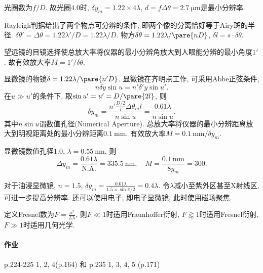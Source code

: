 \documentclass{ctexart}
\begin{document}
\begin{sample}
    \begin{ex}
        光圈数为$f/D$. 故光圈$4.0$时, $\delta y_m = 1.22\times 4\lambda$, $d = f\Delta\theta = \SI{2.7}{\micro\meter}$是最小分辨率.
    \end{ex}
\end{sample}
Rayleigh判据给出了两个物点可分辨的条件, 即两个像的分离恰好等于Airy斑的半径. $\delta\theta' = \Delta\theta = 1.22\lambda'/D = 1.22\lambda/D$. 物方$\displaystyle \delta\theta = 1.22\lambda/\pare{nD}$, $\delta l = s\cdot\delta\theta$.
\par
望远镜的目镜选择使总放大率将仪器的最小分辨角放大到人眼能分辨的最小角度$1'$. 故有效放大率$M = 1'/\delta\theta$.
\par
显微镜的物镜$\delta = 1.22\lambda/\pare{n'D}$. 显微镜在齐明点工作, 可采用Abbe正弦条件,
\[ n\delta y\sin u = n'\delta'y\sin u'. \]
在$u\gg u'$的条件下, 取$\sin u' = u' = D/\pare{2l}$, 则
\[ \delta y_m = \frac{n' \frac{D/2}{l}\Delta\theta_m l}{n\sin u} = \frac{0.61\lambda}{n\sin u}. \]
其中$n\sin u$谓数值孔径(Numerical Aperture). 总放大率将仪器的最小分辨距离放大到明视距离处的最小分辨距离$\SI{0.1}{\milli\meter}$. 有效放大率$M = \SI{0.1}{\milli\meter}/\delta y_m$.
\begin{sample}
    \begin{ex}
        显微镜数值孔径$1.0$, $\lambda = \SI{0.55}{\nano\meter}$, 则
        \[ \Delta y_m = \frac{0.61\lambda}{\mathrm{N.A.}} = \SI{335.5}{\nano\meter},\quad M = \frac{\SI{0.1}{\milli\meter}}{8y_m} = 300. \]
    \end{ex}
\end{sample}
对于油浸显微镜, $n=1.5$, $\delta y_m = \displaystyle \frac{0.61\lambda}{1.5\times\sin \pi/2} = 0.4\lambda$. 令$\lambda$减小至紫外区甚至X射线区, 可进一步提高分辨率. 还可以使用电子, 即电子显微镜, 此时使用磁场聚焦.


\begin{remark}
    定义Fresnel数为$\displaystyle F = \frac{a^2}{L\lambda}$, 则$F\ll 1$时适用Fraunhoffer衍射, $F\gtrapprox 1$时适用Fresnel衍射, $F \gg 1$时适用几何光学.
\end{remark}

\paragraph{作业} %
\label{par:作业}

p.224-225 1, 2, 4(p.164) 和 p.235 1, 3, 4, 5 (p.171)
\end{document}
